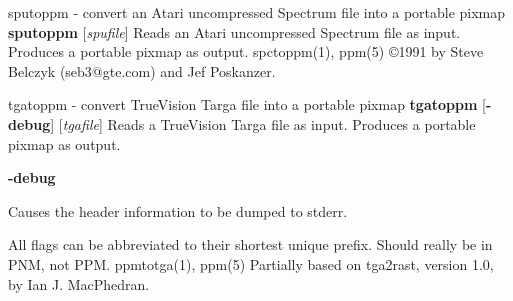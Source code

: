 \newpage
%

sputoppm - convert an Atari uncompressed Spectrum file into a portable pixmap
{\bf sputoppm}
{\rm [}{\it spufile}{\rm ]}
Reads an Atari uncompressed Spectrum file as input.
Produces a portable pixmap as output.
spctoppm(1), ppm(5)
\copyright 1991 by Steve Belczyk (seb3@gte.com) and Jef Poskanzer.
%
 
%

\newpage
%

tgatoppm - convert TrueVision Targa file into a portable pixmap
{\bf tgatoppm}
{\rm [}{\bf -debug}{\rm ]}
{\rm [}{\it tgafile}{\rm ]}
Reads a TrueVision Targa file as input.
Produces a portable pixmap as output.
\begin{TPlist}{{\bf -debug}}
\item[{{\bf -debug}}]
Causes the header information to be dumped to stderr.
\end{TPlist}

\par
All flags can be abbreviated to their shortest unique prefix.
Should really be in PNM, not PPM.
ppmtotga(1), ppm(5)
Partially based on tga2rast, version 1.0, by Ian J. MacPhedran.

